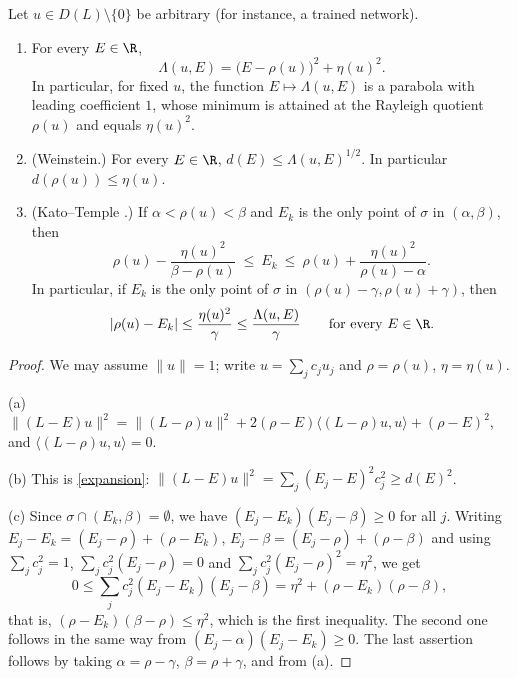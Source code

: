 \begin{proposition}\label{prop.rayleigh}
Let $u\in D(L)\setminus\{0\}$ be arbitrary (for instance, a trained network).
\begin{enumerate}
\item[(a)] For every $E\in\R$,
\[
\Lambda(u,E)=\big(E-\rho(u)\big)^2+\eta(u)^2 .
\]
In particular, for fixed $u$, the function $E\mapsto\Lambda(u,E)$ is a parabola with
leading coefficient $1$, whose minimum is attained at the Rayleigh quotient $\rho(u)$
and equals $\eta(u)^2$.
\item[(b)] (Weinstein.) For every $E\in\R$, $d(E)\le\Lambda(u,E)^{1/2}$. In particular
$d(\rho(u))\le\eta(u)$.
\item[(c)] (Kato--Temple \cite{Kato1949,Parlett1998}.) If $\alpha<\rho(u)<\beta$ and $E_k$ is the only point of
$\sigma$ in $(\alpha,\beta)$, then
\[
\rho(u)-\frac{\eta(u)^2}{\beta-\rho(u)}\ \le\ E_k\ \le\ \rho(u)+\frac{\eta(u)^2}{\rho(u)-\alpha}.
\]
In particular, if $E_k$ is the only point of $\sigma$ in
$(\rho(u)-\gamma,\rho(u)+\gamma)$, then
\[
|\rho(u)-E_k|\le\frac{\eta(u)^2}{\gamma}\le\frac{\Lambda(u,E)}{\gamma}\qquad\text{for every }E\in\R.
\]
\end{enumerate}
\end{proposition}

\begin{proof}
We may assume $\|u\|=1$; write $u=\sum_jc_ju_j$ and $\rho=\rho(u)$, $\eta=\eta(u)$.

(a) $\|(L-E)u\|^2=\|(L-\rho)u\|^2+2(\rho-E)\langle(L-\rho)u,u\rangle+(\rho-E)^2$, and
$\langle(L-\rho)u,u\rangle=0$.

(b) This is \eqref{expansion}: $\|(L-E)u\|^2=\sum_j(E_j-E)^2c_j^2\ge d(E)^2$.

(c) Since $\sigma\cap(E_k,\beta)=\emptyset$, we have $(E_j-E_k)(E_j-\beta)\ge0$ for all $j$.
Writing $E_j-E_k=(E_j-\rho)+(\rho-E_k)$, $E_j-\beta=(E_j-\rho)+(\rho-\beta)$ and using
$\sum_jc_j^2=1$, $\sum_jc_j^2(E_j-\rho)=0$ and $\sum_jc_j^2(E_j-\rho)^2=\eta^2$, we get
\[
0\le\sum_jc_j^2(E_j-E_k)(E_j-\beta)=\eta^2+(\rho-E_k)(\rho-\beta),
\]
that is, $(\rho-E_k)(\beta-\rho)\le\eta^2$, which is the first inequality. The second one
follows in the same way from $(E_j-\alpha)(E_j-E_k)\ge0$. The last assertion follows by
taking $\alpha=\rho-\gamma$, $\beta=\rho+\gamma$, and from (a).
\end{proof}

